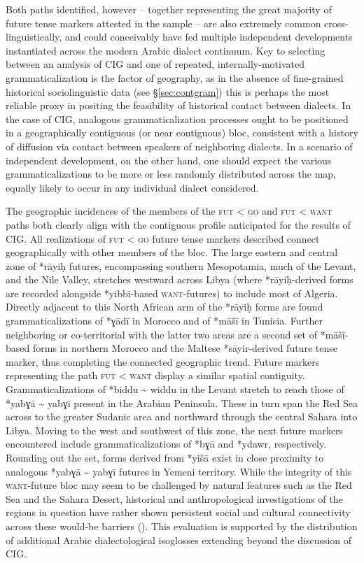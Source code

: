 \documentclass[output=paper]{langsci/langscibook}
\begin{document}
Both paths identified, however – together representing the great majority of future tense markers attested in the sample – are also extremely common cross-linguistically, and could conceivably have fed multiple independent developments instantiated across the modern Arabic dialect continuum. Key to selecting between an analysis of CIG and one of repeated, internally-motivated grammaticalization is the factor of geography, as in the absence of fine-grained historical sociolinguistic data (see §\ref{sec:contgram}) this is perhaps the most reliable proxy in positing the feasibility of historical contact between dialects. In the case of CIG, analogous grammaticalization processes ought to be positioned in a geographically contiguous (or near contiguous) bloc, consistent with a history of diffusion via contact between speakers of neighboring dialects. In a scenario of independent development, on the other hand, one should expect the various grammaticalizations to be more or less randomly distributed across the map, equally likely to occur in any individual dialect considered.

The geographic incidences of the members of the \textsc{fut} < \textsc{go} and \textsc{fut} < \textsc{want} paths both clearly align with the contiguous profile anticipated for the results of CIG. All realizations of \textsc{fut} < \textsc{go} future tense markers described connect geographically with other members of the bloc. The large eastern and central zone of *rāyiḥ futures, encompassing southern Mesopotamia, much of the Levant, and the Nile Valley, stretches westward across Libya (where *rāyiḥ{}-derived forms are recorded alongside *yibbī-based \textsc{want}{}-futures) to include most of Algeria. Directly adjacent to this North African arm of the *rāyiḥ forms are found grammaticalizations of *ɣādī in Morocco and of *māšī in Tunisia. Further neighboring or co-territorial with the latter two areas are a second set of *māšī{}-based forms in northern Morocco and the Maltese *sāyir-derived future tense marker, thus completing the connected geographic trend. Future markers representing the path \textsc{fut} < \textsc{want} display a similar spatial contiguity. Grammaticalizations of *biddu {\textasciitilde} widdu in the Levant stretch to reach those of *yabɣā {\textasciitilde} yabɣī present in the Arabian Peninsula. These in turn span the Red Sea across to the greater Sudanic area and northward through the central Sahara into Libya. Moving to the west and southwest of this zone, the next future markers encountered include grammaticalizations of *bɣā and *ydawr, respectively. Rounding out the set, forms derived from *yišā exist in close proximity to analogous *yabɣā {\textasciitilde} yabɣī futures in Yemeni territory. While the integrity of this \textsc{want}{}-future bloc may seem to be challenged by natural features such as the Red Sea and the Sahara Desert, historical and anthropological investigations of the regions in question have rather shown persistent social and cultural connectivity across these would-be barriers (\citealt{Lydon2009,Power2012}). This evaluation is supported by the distribution of additional Arabic dialectological isoglosses extending beyond the discussion of CIG.
\end{document}
